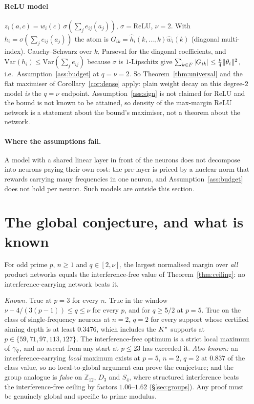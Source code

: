 \paragraph{ReLU model} $z_i(a,c)=w_i(c)\,\sigma(\sum_je_{ij}(a_j))$, $\sigma=\mathrm{ReLU}$, $\nu=2$. With
$h_i=\sigma(\sum_je_{ij}(a_j))$ the atom is $G_{ik}=\hat h_i(k,\dots,k)\overline{\hat w_i(k)}$ (diagonal multi-index).
Cauchy--Schwarz over $k$, Parseval for the diagonal coefficients, and $\mathrm{Var}(h_i)\le\mathrm{Var}(\sum_je_{ij})$
because $\sigma$ is $1$-Lipschitz give $\sum_{k\in F}|G_{ik}|\le\tfrac p4\|\theta_i\|^2$, i.e.\
Assumption~\ref{ass:budget} at $q=\nu=2$. So Theorem~\ref{thm:universal} and the flat maximiser of
Corollary~\ref{cor:dense} apply: plain weight decay on this degree-$2$ model \emph{is} the $q=\nu$ endpoint.
Assumption~\ref{ass:sign} is not claimed for ReLU and the bound is not known to be attained, so density of
the max-margin ReLU network is a statement about the bound's maximiser, not a theorem about the network.

\paragraph{Where the assumptions fail.} A model with a shared linear layer in front of the neurons does not
decompose into neurons paying their own cost: the pre-layer is priced by a nuclear norm that rewards carrying
many frequencies in one neuron, and Assumption~\ref{ass:budget} does not hold per neuron. Such models are
outside this section.

\section{The global conjecture, and what is known}
\label{app:conjecture}

\begin{conjecture}
For odd prime $p$, $n\ge1$ and $q\in[2,\nu]$, the largest normalised margin over \emph{all} product networks equals
the interference-free value of Theorem~\ref{thm:ceiling}: no interference-carrying network beats it.
\end{conjecture}

\emph{Known.} True at $p=3$ for every $n$. True in the window $\nu-4/(3(p-1))\le q\le\nu$ for every $p$, and
for $q\ge5/2$ at $p=5$. True on the class of single-frequency neurons at $n=2$, $q=2$ for every support whose
certified aiming depth is at least $0.3476$, which includes the $K^{*}$ supports at $p\in\{59,71,97,113,127\}$.
The interference-free optimum is a strict local maximum of $\gamma_q$, and no ascent from any start at $p\le23$
has exceeded it. \emph{Also known:} an interference-carrying \emph{local} maximum exists at $p=5$, $n=2$,
$q=2$ at $0.837$ of the class value, so no local-to-global argument can prove the conjecture; and the group
analogue is \emph{false} on $\mathbb{Z}_{12}$, $D_3$ and $S_4$, where structured interference beats the
interference-free ceiling by factors $1.06$--$1.62$ (\S\ref{sec:groups}). Any proof must be genuinely global
and specific to prime modulus.

